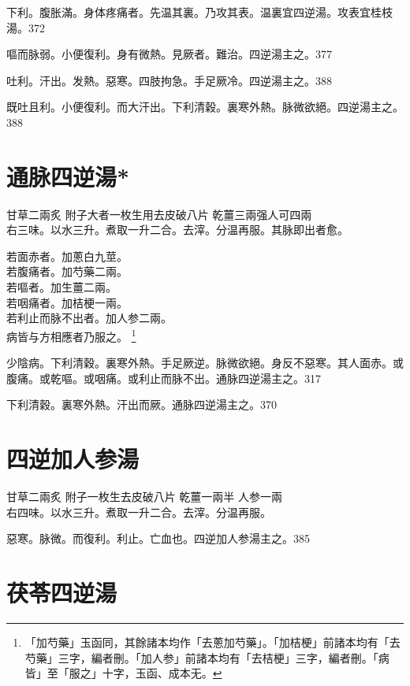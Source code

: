 下利。腹{\khaaitp 胀}滿。身体疼痛者。先温其裏。乃攻其表。温裏宜四逆湯。攻表宜桂枝湯。372

嘔而脉弱。小便復利。身有微熱。見厥者。難治。四逆湯主之。377

吐利。汗出。发熱。惡寒。四肢拘急。手足厥冷。四逆湯主之。388

既吐且利。小便復利。而大汗出。下利清穀。裏寒外熱。脉微欲絕。四逆湯主之。388

\section{通脉四逆湯*}

甘草{\scriptsize 二兩炙} 附子{\scriptsize 大者一枚生用去皮破八片} 乾薑{\scriptsize 三兩强人可四兩}\\
右三味。以水三升。煮取一升二合。去滓。分温再服。其脉即出者愈。

{\khaaitp 若}面赤者。加蔥{\khaaitp 白}九莖。\\
{\khaaitp 若}腹痛者。加芍藥二兩。\\
{\khaaitp 若}嘔者。加生薑二兩。\\
{\khaaitp 若}咽痛者。加桔梗一兩。\\
{\khaaitp 若}利止而脉不出者。加人参二兩。\\
{\khaaitp 病皆与方相應者乃服之。}
	\footnote{
		「加芍藥」玉函同，其餘諸本均作「去蔥加芍藥」。「加桔梗」前諸本均有「去芍藥」三字，編者刪。「加人参」前諸本均有「去桔梗」三字，編者刪。「病皆」至「服之」十字，玉函、成本无。
	}

少陰病。下利清穀。裏寒外熱。手足厥逆。脉微欲絕。身反不惡寒。其人面赤。或腹痛。或乾嘔。或咽痛。或利止而脉不出。通脉四逆湯主之。317

下利清穀。裏寒外熱。汗出而厥。通脉四逆湯主之。370

\section{四逆加人参湯}

甘草{\scriptsize 二兩炙} 附子{\scriptsize 一枚生去皮破八片} 乾薑{\scriptsize 一兩半} 人参{\scriptsize 一兩}\\
右四味。以水三升。煮取一升二合。去滓。分温再服。

惡寒。脉微。而復利。利止。亡血也。四逆加人参湯主之。385

\section{茯苓四逆湯}

